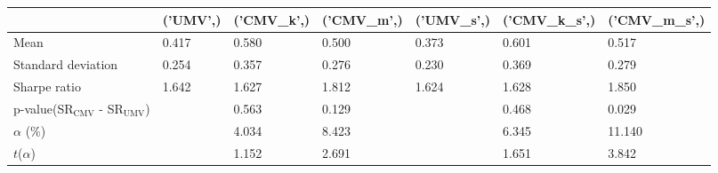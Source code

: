 \begin{tabular}{lllllll}
\toprule
 & ('UMV',) & ('CMV_k',) & ('CMV_m',) & ('UMV_s',) & ('CMV_k_s',) & ('CMV_m_s',) \\
\midrule
Mean & 0.417 & 0.580 & 0.500 & 0.373 & 0.601 & 0.517 \\
Standard deviation & 0.254 & 0.357 & 0.276 & 0.230 & 0.369 & 0.279 \\
Sharpe ratio & 1.642 & 1.627 & 1.812 & 1.624 & 1.628 & 1.850 \\
p-value(SR$_{\text{CMV}}$ - SR$_{\text{UMV}}$) &  & 0.563 & 0.129 &  & 0.468 & 0.029 \\
$\alpha$ (\%) &  & 4.034 & 8.423 &  & 6.345 & 11.140 \\
$t$($\alpha$) &  & 1.152 & 2.691 &  & 1.651 & 3.842 \\
\bottomrule
\end{tabular}
